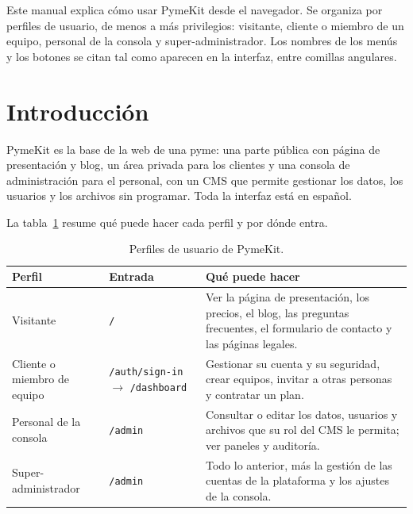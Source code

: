 \label{cap:manual-usuario}

Este manual explica cómo usar PymeKit desde el navegador. Se organiza por
perfiles de usuario, de menos a más privilegios: visitante, cliente o miembro
de un equipo, personal de la consola y super-administrador. Los nombres de los
menús y los botones se citan tal como aparecen en la interfaz, entre comillas
angulares.

\section{Introducción}
\label{sec:ug-introduccion}

PymeKit es la base de la web de una pyme: una parte pública con página de
presentación y blog, un área privada para los clientes y una consola de
administración para el personal, con un CMS que permite gestionar los datos,
los usuarios y los archivos sin programar. Toda la interfaz está en español.

La tabla~\ref{tab:ug-perfiles} resume qué puede hacer cada perfil y por dónde
entra.

\begin{table}[htbp]
  \centering
  \small
  \caption{Perfiles de usuario de PymeKit.}
  \label{tab:ug-perfiles}
  \begin{tabularx}{\textwidth}{@{}>{\raggedright\arraybackslash}p{3cm}>{\raggedright\arraybackslash}p{3.2cm}X@{}}
    \toprule
    \textbf{Perfil} & \textbf{Entrada} & \textbf{Qué puede hacer} \\
    \midrule
    Visitante & \texttt{/} & Ver la página de presentación, los precios, el blog, las preguntas frecuentes, el formulario de contacto y las páginas legales. \\
    Cliente o miembro de equipo & \texttt{/auth/sign-in} $\rightarrow$ \texttt{/dashboard} & Gestionar su cuenta y su seguridad, crear equipos, invitar a otras personas y contratar un plan. \\
    Personal de la consola & \texttt{/admin} & Consultar o editar los datos, usuarios y archivos que su rol del CMS le permita; ver paneles y auditoría. \\
    Super-administrador & \texttt{/admin} & Todo lo anterior, más la gestión de las cuentas de la plataforma y los ajustes de la consola. \\
    \bottomrule
  \end{tabularx}
\end{table}

